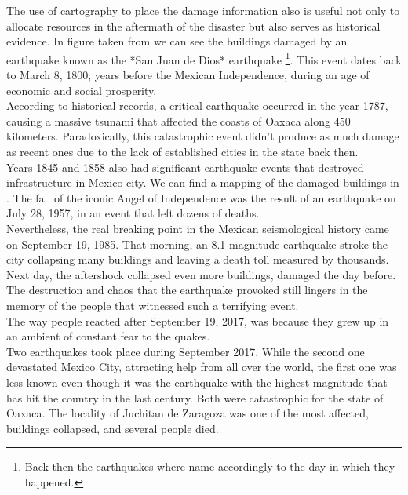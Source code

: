 The use of cartography to place the damage information also is useful not only to allocate resources in the aftermath of the disaster but also serves as historical evidence. In figure \cite{fig:quake1800} taken from \cite{AG3316} we can see the buildings damaged by an earthquake known as the *San Juan de Dios* earthquake \footnote{Back then the earthquakes where name accordingly to the day in which they happened.}. This event dates back to March 8, 1800, years before the Mexican Independence, during an age of economic and social prosperity.\\

According to historical records, a critical earthquake occurred in the year 1787, causing a massive tsunami that affected the coasts of Oaxaca along 450 kilometers. Paradoxically, this catastrophic event didn't produce as much damage as recent ones due to the lack of established cities in the state back then.\\

Years 1845 and 1858 also had significant earthquake events that destroyed infrastructure in Mexico city. We can find a mapping of the damaged buildings in \cite{AG3316}. The fall of the iconic Angel of Independence was the result of an earthquake on July 28, 1957, in an event that left dozens of deaths.\\

Nevertheless, the real breaking point in the Mexican seismological history came on September 19, 1985. That morning, an 8.1 magnitude earthquake stroke the city collapsing many buildings and leaving a death toll measured by thousands. Next day, the aftershock collapsed even more buildings, damaged the day before. The destruction and chaos that the earthquake provoked still lingers in the memory of the people that witnessed such a terrifying event.\\

The way people reacted after September 19, 2017, was because they grew up in an ambient of constant fear to the quakes.\\

Two earthquakes took place during September 2017. While the second one devastated Mexico City, attracting help from all over the world, the first one was less known even though it was the earthquake with the highest magnitude that has hit the country in the last century. Both were catastrophic for the state of Oaxaca. The locality of Juchitan de Zaragoza was one of the most affected, buildings collapsed, and several people died.\\

